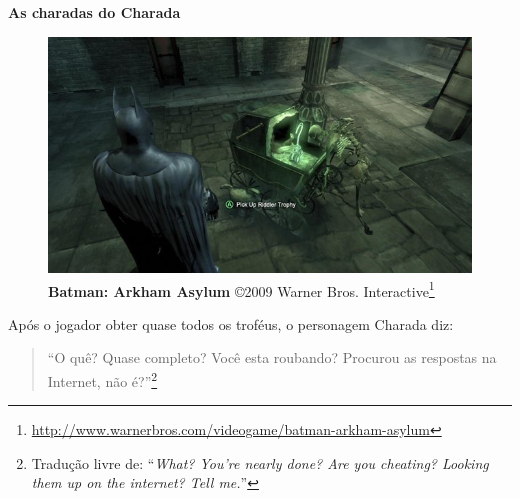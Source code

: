 \expandafter\documentclass\expandafter[table, usenames, svgnames, dvipsnames, \classopts]{beamer}
\begin{document}
\begin{frame}{\textbf{As charadas do Charada}}

	\begin{figure}
		\centering
		\includegraphics[draft,height=0.3\paperheight]{batman-riddler}
		\caption{\tiny \textbf{Batman: Arkham Asylum} \copyright{2009} Warner Bros. Interactive\footnote{\url{http://www.warnerbros.com/videogame/batman-arkham-asylum}}}
	\end{figure}

	Após o jogador obter quase todos os troféus, o personagem Charada diz:

	\vspace{1em}

	\begin{verse}
		\noindent
		\Large
		``O quê? Quase completo? Você esta roubando? Procurou as respostas na Internet, não é?''\footnote{Tradução livre de: ``\textit{What? You're nearly done? Are you cheating? Looking them up on the internet? Tell me.}''}
	\end{verse}
	
	\vspace{1em}
	
\end{frame}
\end{document}
